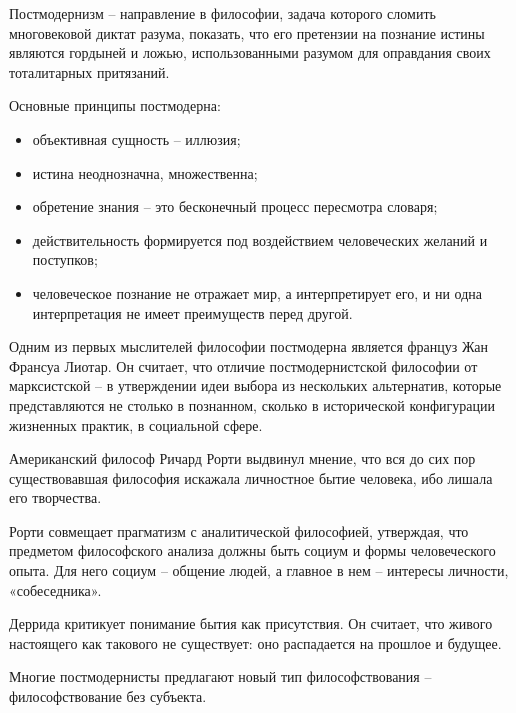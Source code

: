 Постмодернизм -- направление в философии, задача которого сломить многовековой диктат разума, показать, что его претензии на познание истины являются гордыней и ложью, использованными разумом для оправдания своих тоталитарных притязаний.

Основные принципы постмодерна:
\begin{itemize}
	\item объективная сущность – иллюзия;
	\item истина неоднозначна, множественна;
	\item обретение знания – это бесконечный процесс пересмотра словаря;
	\item действительность формируется под воздействием человеческих желаний и поступков;
	\item человеческое познание не отражает мир, а интерпретирует его, и ни одна интерпретация не имеет преимуществ перед другой.
\end{itemize}

Одним из первых мыслителей философии постмодерна является француз Жан Франсуа Лиотар. Он считает, что отличие постмодернистской философии от марксистской – в утверждении идеи выбора из нескольких альтернатив, которые представляются не столько в познанном, сколько в исторической конфигурации жизненных практик, в социальной сфере.

Американский философ Ричард Рорти выдвинул мнение, что вся до сих пор существовавшая философия искажала личностное бытие человека, ибо лишала его творчества.

Рорти совмещает прагматизм с аналитической философией, утверждая, что предметом философского анализа должны быть социум и формы человеческого опыта. Для него социум – общение людей, а главное в нем – интересы личности, «собеседника».

Деррида критикует понимание бытия как присутствия. Он считает, что живого настоящего как такового не существует: оно распадается на прошлое и будущее.

Многие постмодернисты предлагают новый тип философствования – философствование без субъекта.
